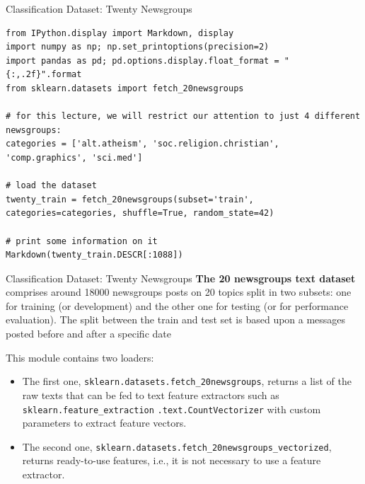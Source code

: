 \documentclass[../../generative_classifiers.tex]{subfiles}
\begin{document}
\begin{frame}[fragile]{Classification Dataset: Twenty Newsgroups}


\begin{lstlisting}
from IPython.display import Markdown, display
import numpy as np; np.set_printoptions(precision=2)
import pandas as pd; pd.options.display.float_format = "{:,.2f}".format
from sklearn.datasets import fetch_20newsgroups

# for this lecture, we will restrict our attention to just 4 different newsgroups:
categories = ['alt.atheism', 'soc.religion.christian', 'comp.graphics', 'sci.med']

# load the dataset
twenty_train = fetch_20newsgroups(subset='train', categories=categories, shuffle=True, random_state=42)

# print some information on it
Markdown(twenty_train.DESCR[:1088])
\end{lstlisting}
\end{frame}

\begin{frame}[fragile]{Classification Dataset: Twenty Newsgroups}
\textbf{The 20 newsgroups text dataset} comprises around 18000 newsgroups posts on 20 topics split in two subsets: one for training (or development) and the other one for testing (or for performance evaluation). The split between the train and test set is based upon a messages posted before and after a specific date

\vspace{0.2cm}
This module contains two loaders:
\begin{itemize}
    \item The first one, \texttt{sklearn.datasets.fetch\_20newsgroups}, returns a list of the raw texts that can be fed to text feature extractors such as \texttt{sklearn.feature\_extraction} \texttt{.text.CountVectorizer} with custom parameters to extract feature vectors.
    \item The second one, \texttt{sklearn.datasets.fetch\_20newsgroups\_vectorized}, returns ready-to-use features, i.e., it is not necessary to use a feature extractor.
\end{itemize}
\end{frame}
\end{document}
